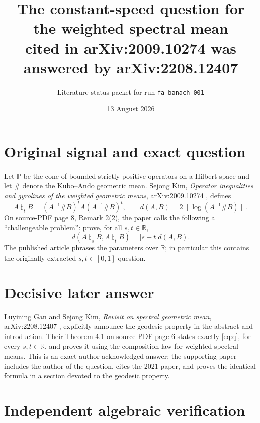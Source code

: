 \documentclass[11pt]{article}
\title{The constant-speed question for the weighted spectral mean\\
cited in arXiv:2009.10274 was answered by arXiv:2208.12407}
\author{Literature-status packet for run \texttt{fa\_banach\_001}}
\date{13 August 2026}
\newcommand{\Pcone}{\mathbb P}
\newcommand{\natmean}{\mathbin{\natural}}
\begin{document}
\maketitle

\begin{center}
\end{center}

\section*{Original signal and exact question}

Let $\Pcone$ be the cone of bounded strictly positive operators on a Hilbert
space and let $\#$ denote the Kubo--Ando geometric mean.  Sejong Kim,
\emph{Operator inequalities and gyrolines of the weighted geometric means},
arXiv:2009.10274 \cite{Kim}, defines
\[
 A\natmean_t B=(A^{-1}\#B)^tA(A^{-1}\#B)^t,
 \qquad
 d(A,B)=2\|\log(A^{-1}\#B)\|.
\]
On source-PDF page 8, Remark 2(2), the paper calls the following a
``challengeable problem'': prove, for all $s,t\in\mathbb R$,
\begin{equation}\label{eq:q}
 d(A\natmean_sB,A\natmean_tB)=|s-t|d(A,B).
\end{equation}
The published article phrases the parameters over $\mathbb R$; in particular
this contains the originally extracted $s,t\in[0,1]$ question.

\section*{Decisive later answer}

Luyining Gan and Sejong Kim, \emph{Revisit on spectral geometric mean},
arXiv:2208.12407 \cite{GK}, explicitly announce the geodesic property in the
abstract and introduction.  Their Theorem 4.1 on source-PDF page 6 states
exactly \eqref{eq:q}, for every $s,t\in\mathbb R$, and proves it using the
composition law for weighted spectral means.  This is an exact
author-acknowledged answer: the supporting paper includes the author of the
question, cites the 2021 paper, and proves the identical formula in a section
devoted to the geodesic property.

\section*{Independent algebraic verification}
\end{document}
